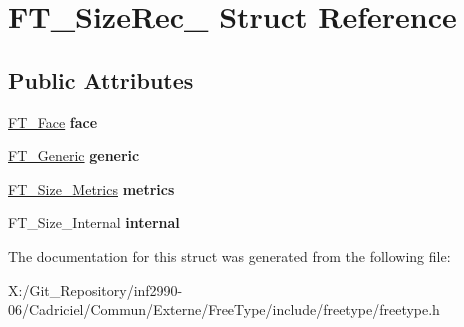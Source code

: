 \hypertarget{struct_f_t___size_rec__}{\section{F\-T\-\_\-\-Size\-Rec\-\_\- Struct Reference}
\label{struct_f_t___size_rec__}
}
\subsection*{Public Attributes}
\begin{DoxyCompactItemize}
\item 
\hypertarget{struct_f_t___size_rec___a21b54fb07feaba8be23321054da98f5f}{\hyperlink{struct_f_t___face_rec__}{F\-T\-\_\-\-Face} {\bfseries face}}\label{struct_f_t___size_rec___a21b54fb07feaba8be23321054da98f5f}

\item 
\hypertarget{struct_f_t___size_rec___aa24520b093a9b4ba9ff388bfe7b9491d}{\hyperlink{struct_f_t___generic__}{F\-T\-\_\-\-Generic} {\bfseries generic}}\label{struct_f_t___size_rec___aa24520b093a9b4ba9ff388bfe7b9491d}

\item 
\hypertarget{struct_f_t___size_rec___a29a6b518d09f6cf1714d9aed01eddc01}{\hyperlink{struct_f_t___size___metrics__}{F\-T\-\_\-\-Size\-\_\-\-Metrics} {\bfseries metrics}}\label{struct_f_t___size_rec___a29a6b518d09f6cf1714d9aed01eddc01}

\item 
\hypertarget{struct_f_t___size_rec___a236c47ea3138e485c29b0d7baa5cf3b6}{F\-T\-\_\-\-Size\-\_\-\-Internal {\bfseries internal}}\label{struct_f_t___size_rec___a236c47ea3138e485c29b0d7baa5cf3b6}

\end{DoxyCompactItemize}


The documentation for this struct was generated from the following file\-:\begin{DoxyCompactItemize}
\item 
X\-:/\-Git\-\_\-\-Repository/inf2990-\/06/\-Cadriciel/\-Commun/\-Externe/\-Free\-Type/include/freetype/freetype.\-h\end{DoxyCompactItemize}
